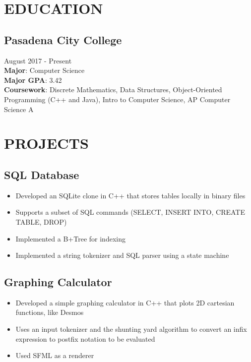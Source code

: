 \documentclass{article}
\begin{document}
\pagestyle{useheader}
\section*{\textcolor{wordblue}{EDUCATION}}
\subsection*{Pasadena City College}
\hfill
\textcolor{wordgrey}{August 2017 - Present}\\
\textbf{Major}: Computer Science\\
\textbf{Major GPA}: 3.42\\
\textbf{Coursework}: Discrete Mathematics, Data Structures, Object-Oriented Programming (C++ and Java), Intro to Computer Science, AP Computer Science A

\section*{\textcolor{wordblue}{PROJECTS}}

\subsection*{SQL Database}
\begin{itemize}
    \item Developed an SQLite clone in C++ that stores tables locally in binary files
    \item Supports a subset of SQL commands (SELECT, INSERT INTO, CREATE TABLE, DROP) 
    \item Implemented a B+Tree for indexing
    \item Implemented a string tokenizer and SQL parser using a state machine
\end{itemize}

\subsection*{Graphing Calculator}
\begin{itemize}
    \item Developed a simple graphing calculator in C++ that plots 2D cartesian functions, like Desmos
    \item Uses an input tokenizer and the shunting yard algorithm to convert an infix expression to postfix notation to be evaluated
    \item Used SFML as a renderer
\end{itemize}
\end{document}
